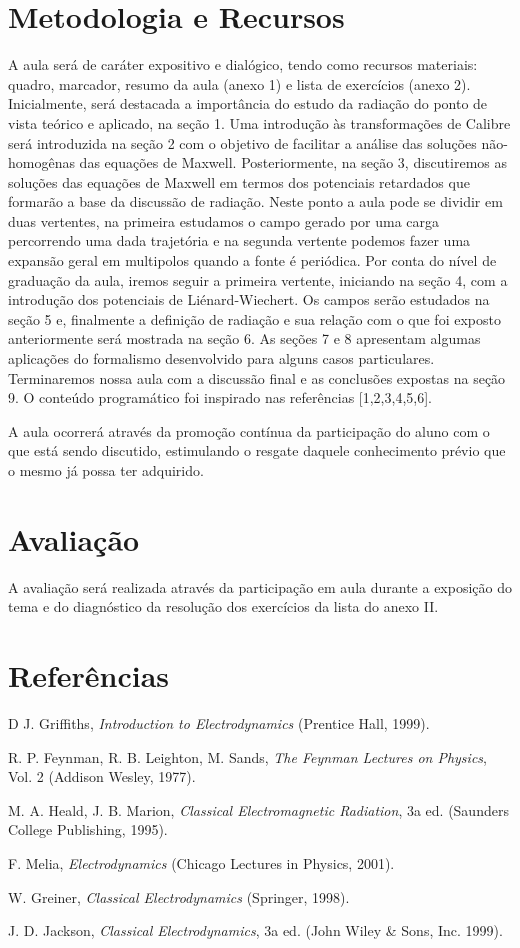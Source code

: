\documentclass{article}
\begin{document}
\section{Metodologia e Recursos}

A aula será de caráter expositivo e dialógico, tendo como recursos materiais: quadro, marcador, resumo da aula (anexo 1) e lista de exercícios (anexo 2). Inicialmente, será destacada a importância do estudo da radiação do ponto de vista teórico e aplicado, na seção 1. Uma introdução às transformações de Calibre será introduzida na seção 2 com o objetivo de facilitar a análise das soluções não-homogênas das equações de Maxwell. Posteriormente, na seção 3, discutiremos as soluções das equações de Maxwell em termos dos potenciais retardados que formarão a base da discussão de radiação. Neste ponto a aula pode se dividir em duas vertentes, na primeira estudamos o campo gerado por uma carga percorrendo uma dada trajetória e na segunda vertente podemos fazer uma expansão geral em multipolos quando a fonte é periódica. Por conta do nível de graduação da aula, iremos seguir a primeira vertente, iniciando na seção 4, com a introdução dos potenciais de Liénard-Wiechert. Os campos serão estudados na seção 5 e, finalmente a definição de radiação e sua relação com o que foi exposto anteriormente será mostrada na seção 6. As seções 7 e 8 apresentam algumas aplicações do formalismo desenvolvido para alguns casos particulares. Terminaremos nossa aula com a discussão final e as conclusões expostas na seção 9. O conteúdo programático foi inspirado nas referências [1,2,3,4,5,6].

A aula ocorrerá através da promoção contínua da participação do aluno com o que está sendo discutido, estimulando o resgate daquele conhecimento prévio que o mesmo já possa ter adquirido.

\section{Avaliação}

A avaliação será realizada através da participação em aula durante a exposição do tema e do diagnóstico da resolução dos exercícios da lista do anexo II. 

\section{Referências}

\noindent [1] D J. Griffiths, \textit{Introduction to Electrodynamics} (Prentice Hall, 1999).

\noindent [2] R. P. Feynman, R. B. Leighton, M. Sands, \textit{The Feynman Lectures on Physics}, Vol. 2 (Addison Wesley, 1977).

\noindent [3] M. A. Heald, J. B. Marion, \textit{Classical Electromagnetic Radiation}, 3a ed. (Saunders College Publishing, 1995).

\noindent [4] F. Melia, \textit{Electrodynamics} (Chicago Lectures in Physics, 2001).

\noindent [5] W. Greiner, \textit{Classical Electrodynamics} (Springer, 1998).

\noindent [6] J. D. Jackson, \textit{Classical Electrodynamics}, 3a ed. (John Wiley \& Sons, Inc. 1999).
\end{document}
